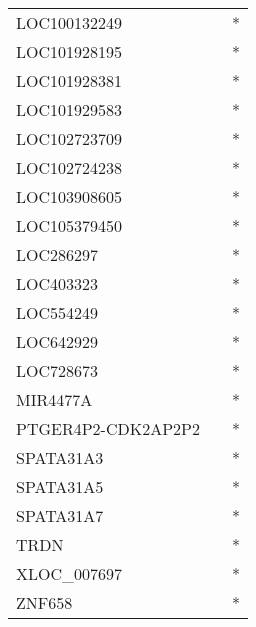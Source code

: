 \begin{longtable}{lcc}
LOC100132249       &                &          * \\
LOC101928195       &                &          * \\
LOC101928381       &                &          * \\
LOC101929583       &                &          * \\
LOC102723709       &                &          * \\
LOC102724238       &                &          * \\
LOC103908605       &                &          * \\
LOC105379450       &                &          * \\
LOC286297          &                &          * \\
LOC403323          &                &          * \\
LOC554249          &                &          * \\
LOC642929          &                &          * \\
LOC728673          &                &          * \\
MIR4477A           &                &          * \\
PTGER4P2-CDK2AP2P2 &                &          * \\
SPATA31A3          &                &          * \\
SPATA31A5          &                &          * \\
SPATA31A7          &                &          * \\
TRDN               &                &          * \\
XLOC\_007697        &                &          * \\
ZNF658             &                &          * \\
\end{longtable}
